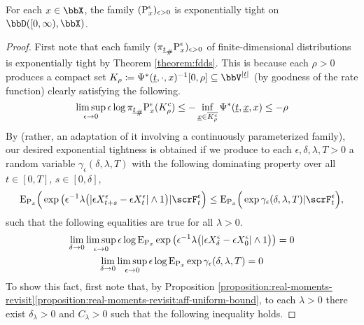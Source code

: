 \begin{proposition}
  \label{proposition:exponential-tightness}
  For each $\stateVar \in \stateSpace$, the family $(\Prb^\epsilon_\stateVar)_{\epsilon>0}$ is exponentially tight on $\pathSpace{[0,\infty)}{\stateSpace}$.
\end{proposition}
\begin{proof}
  \label{proof:proposition:exponential-tightness}
  First note that each family $(\push{\Prb^\epsilon_\stateVar}{\pi_{\underline t}})_{\epsilon>0}$ of finite-dimensional distributions is exponentially tight by Theorem \ref{theorem:fdds}.
  This is because each $\rho > 0$ produces a compact set $K_\rho \defeq \aff^*(\underline t, \cdot, \stateVar)^{-1}[0,\rho] \subseteq \vecSpace^{|\underline t|}$ (by goodness of the rate function) clearly satisfying the following.
  \begin{equation*}
    \limsup_{\epsilon\rightarrow0} \epsilon\log\push{\Prb^\epsilon_\stateVar}{\pi_{\underline t}} (K_\rho^c) \leq -\inf_{\underline\stateVar\in \overline{K_\rho^c}} \aff^*(\underline t, \underline\stateVar, \stateVar) \leq -\rho
  \end{equation*}
  By \cite[Theorem 4.1]{feng2006} (rather, an adaptation of it involving a continuously parameterized family), our desired exponential tightness is obtained if we produce to each $\epsilon, \delta, \lambda, T > 0$ a random variable $\gamma_\epsilon(\delta,\lambda,T)$ with the following dominating property over all $t \in [0,T]$, $s \in [0,\delta]$,
  \begin{gather}
    \label{eq:gamma-dominating}
    \Exp_{\Prb_\stateVar}\Big(
      \exp\big( \epsilon^{-1} \lambda \big( |\Xe_{t+s}-\Xe_t| \wedge 1 \big) 
      | \scrF^\epsilon_t \Big) 
    \leq \Exp_{\Prb_\stateVar}\Big( 
      \exp\gamma_\epsilon(\delta, \lambda, T) 
      | \scrF^\epsilon_t \Big),
  \end{gather}
  such that the following equalities are true for all $\lambda > 0$.
  \begin{gather}
    \label{eq:no-gamma-bound}
    \lim_{\delta\rightarrow0} \limsup_{\epsilon\rightarrow0} 
      \epsilon\log\Exp_{\Prb_\stateVar}\exp\big( 
        \epsilon^{-1}\lambda \big(|\Xe_\delta - \Xe_0| \wedge 1\big) 
      \big) = 0 \\
    \label{eq:gamma-bound}
    \lim_{\delta\rightarrow0} \limsup_{\epsilon\rightarrow0} \epsilon\log\Exp_{\Prb_\stateVar}\exp\gamma_\epsilon(\delta,\lambda, T) = 0 
  \end{gather}
  To show this fact, first note that, by Proposition \ref{proposition:real-moments-revisit}\ref{proposition:real-moments-revisit:aff-uniform-bound}, to each $\lambda > 0$ there exist $\delta_\lambda > 0$ and $C_\lambda > 0$ such that the following inequality holds.

\end{proof}
